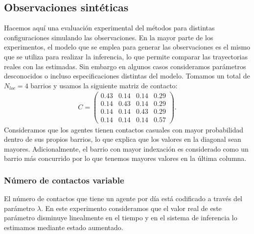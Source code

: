 \subsection{Observaciones sintéticas}

Hacemos aquí una evaluación experimental del métodos para distintas configuraciones simulando las observaciones. En la mayor parte de los experimentos, el modelo que se emplea para generar las observaciones es el mismo que se utiliza para realizar la inferencia, lo que permite comparar las trayectorias reales con las estimadas. Sin embargo en algunos casos consideramos parámetros desconocidos o incluso especificaciones distintas del modelo. Tomamos un total de $N_{loc} = 4$ barrios y usamos la siguiente matriz de contacto:
\begin{align*}
    C = 
    \begin{pmatrix}
        0.43 & 0.14 & 0.14 & 0.29 \\
        0.14 & 0.43 & 0.14 & 0.29 \\
        0.14 & 0.14 & 0.43 & 0.29 \\
        0.14 & 0.14 & 0.14 & 0.57 
    \end{pmatrix}.
\end{align*}
Consideramos que los agentes tienen contactos casuales con mayor probabilidad dentro de sus propios barrios, lo que explica que los valores en la diagonal sean mayores. Adicionalmente, el barrio con mayor indexación es considerado como un barrio más concurrido por lo que tenemos mayores valores en la última columna.

\subsubsection{Número de contactos variable}

El número de contactos que tiene un agente por día está codificado a través del parámetro $\lambda$. En este experimento consideramos que el valor real de este parámetro disminuye linealmente en el tiempo y en el sistema de inferencia lo estimamos mediante estado aumentado.

